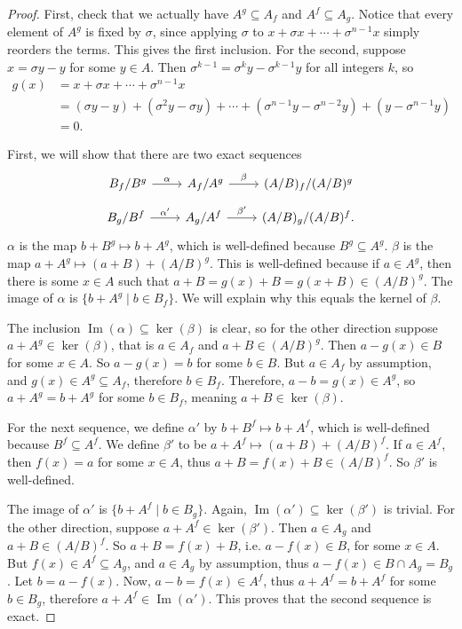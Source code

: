 \documentclass[10pt]{article}
\DeclareMathOperator*{\im}{Im}
\begin{document}
\begin{enumerate}
\begin{enumerate}
\begin{proof}
First, check that we actually have $A^g \subseteq A_f$ and $A^f \subseteq A_g$.  Notice that every element of $A^g$ is fixed by $\sigma$, since applying $\sigma$ to $x + \sigma x + \cdots + \sigma^{n-1}x$ simply reorders the terms.  This gives the first inclusion.  For the second, suppose $x = \sigma y - y$ for some $y \in A$.  Then $\sigma^{k-1} = \sigma^k y - \sigma^{k-1}y$ for all integers $k$, so
\begin{align*}
g(x) &= x + \sigma x + \cdots + \sigma^{n-1} x \\
&= (\sigma y - y) + (\sigma^2 y - \sigma y) + \cdots + (\sigma^{n-1} y - \sigma^{n-2}y) + (y - \sigma^{n-1} y) \\
&= 0.
\end{align*}

First, we will show that there are two exact sequences
$$
\begin{tikzcd}
B_f / B^g \arrow[r, "\alpha"] & A_f / A^g \arrow[r, "\beta"] & (A/B)_f / (A/B)^g
\end{tikzcd}
$$
$$
\begin{tikzcd}
B_g / B^f \arrow[r, "\alpha'"] & A_g / A^f \arrow[r, "\beta'"] & (A/B)_g / (A/B)^f.
\end{tikzcd}
$$
$\alpha$ is the map $b+B^g \mapsto b+A^g$, which is well-defined because $B^g \subseteq A^g$.  $\beta$ is the map $a+A^g \mapsto (a+B) + (A/B)^g$.  This is well-defined because if $a \in A^g$, then there is some $x \in A$ such that $a+B = g(x) + B = g(x+B) \in (A/B)^g.$  The image of $\alpha$ is $\{b + A^g \mid b \in B_f\}$.  We will explain why this equals the kernel of $\beta$.

The inclusion $\im(\alpha) \subseteq \ker(\beta)$ is clear, so for the other direction suppose $a+A^g \in \ker(\beta)$, that is $a \in A_f$ and $a+B \in (A/B)^g$.  Then $a - g(x) \in B$ for some $x \in A$.  So $a - g(x) = b$ for some $b \in B$.  But $a \in A_f$ by assumption, and $g(x) \in A^g \subseteq A_f$, therefore $b \in B_f$.  Therefore, $a - b  = g(x) \in A^g$, so $a + A^g = b + A^g$ for some $b \in B_f$, meaning $a + B \in \ker(\beta)$.

For the next sequence, we define $\alpha'$ by $b + B^f \mapsto b + A^f$, which is well-defined because $B^f \subseteq A^f$.  We define $\beta'$ to be $a + A^f \mapsto (a+B) + (A/B)^f$.  If $a \in A^f$, then $f(x) = a$ for some $x \in A$, thus $a+B = f(x) + B \in (A/B)^f$.  So $\beta'$ is well-defined.

The image of $\alpha'$ is $\{b+A^f \mid b \in B_g\}$.  Again, $\im(\alpha') \subseteq \ker(\beta')$ is trivial.  For the other direction, suppose $a + A^f \in \ker(\beta')$.  Then $a \in A_g$ and $a+B \in (A/B)^f$.  So $a+B = f(x) + B$, i.e. $a - f(x) \in B$, for some $x \in A$.  But $f(x) \in A^f \subseteq A_g$, and $a \in A_g$ by assumption, thus $a - f(x) \in B \cap A_g = B_g$.  Let $b = a - f(x)$.  Now, $a - b = f(x) \in A^f$, thus $a + A^f = b + A^f$ for some $b \in B_g$, therefore $a + A^f \in \im(\alpha')$.  This proves that the second sequence is exact.


\end{proof}
\end{enumerate}
\end{enumerate}
\end{document}
